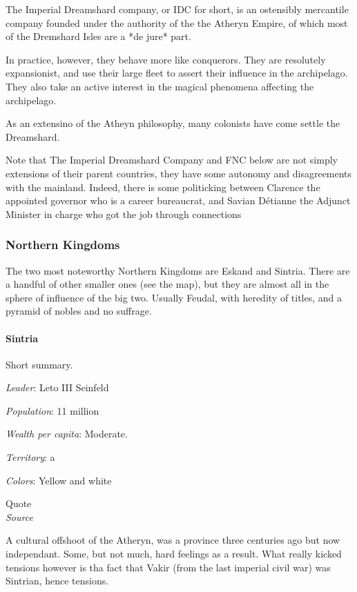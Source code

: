 The Imperial Dreamshard company, or IDC for short, is an ostensibly mercantile company founded under the authority of the the Atheryn Empire, of which most of the Dremshard Isles are a *de jure* part.

In practice, however, they behave more like conquerors. They are resolutely expansionist, and use their large fleet to assert their influence in the archipelago. They also take an active interest in the magical phenomena affecting the archipelago.

As an extensino of the Atheyn philosophy, many colonists have come settle the Dreamshard.


Note that The Imperial Dreamshard Company and FNC below are not simply extensions of their parent countries, they have some autonomy and disagreements with the mainland. Indeed, there is some politicking between Clarence the appointed governor who is a career bureaucrat, and Savian Détianne the Adjunct Minister in charge who got the job through connections



\subsubsection{Northern Kingdoms}

The two most noteworthy Northern Kingdoms are Eskand and Sintria. There are a handful of other smaller ones (see the map), but they are almost all in the sphere of influence of the big two. Usually Feudal, with heredity of titles, and a pyramid of nobles and no suffrage.




\paragraph{Sintria}

Short summary.

\textit{Leader}: Leto III Seinfeld

\textit{Population}: 11 million

\textit{Wealth per capita}: Moderate.

\textit{Territory}: a
    
\textit{Colors}: Yellow and white


\begin{rpg-quotebox}
    Quote \\ \textendash \textit{Source}
    \end{rpg-quotebox}


A cultural offshoot of the Atheryn, was a province three centuries ago but now independant. Some, but not much, hard feelings as a result. What really kicked tensions however is tha fact that Vakir (from the last imperial civil war) was Sintrian, hence tensions.

